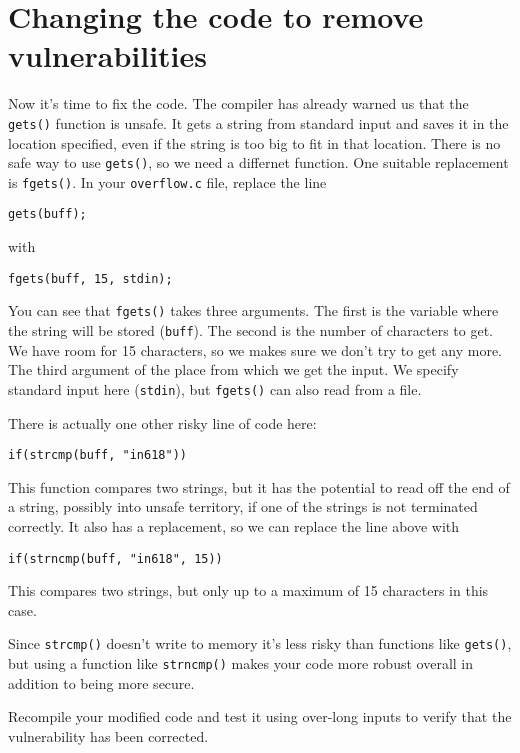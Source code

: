 \documentclass{article}
\begin{document}
\newpage 

\section{Changing the code to remove vulnerabilities}
Now it's time to fix the code. The compiler has already warned us that the \texttt{gets()} function is unsafe. It gets a string from standard input and saves it in the location specified, even if the string is too big to fit in that location. There is no safe way to use \texttt{gets()}, so we need a differnet function. One suitable replacement is \texttt{fgets()}. In your \texttt{overflow.c} file, replace the line

\texttt{gets(buff);}

with 

\texttt{fgets(buff, 15, stdin);}

You can see that \texttt{fgets()} takes three arguments.  The first is the variable where the string will be stored (\texttt{buff}). The second is the number of characters to get. We have room for 15 characters, so we makes sure we don't try to get any more.  The third argument of the place from which we get the input.  We specify standard input here (\texttt{stdin}), but \texttt{fgets()} can also read from a file.

There is actually one other risky line of code here:

\texttt{if(strcmp(buff, "in618"))}

This function compares two strings, but it has the potential to read off the end of a string, possibly into unsafe territory, if one of the strings is not terminated correctly. It also has a replacement, so we can replace the line above with 

\texttt{if(strncmp(buff, "in618", 15))}

This compares two strings, but only up to a maximum of 15 characters in this case.

Since \texttt{strcmp()} doesn't write to memory it's less risky than functions like \texttt{gets()}, but using a function like \texttt{strncmp()} makes your code more robust overall in addition to being more secure.

Recompile your modified code and test it using over-long inputs to verify that the vulnerability has been corrected.
\end{document}
